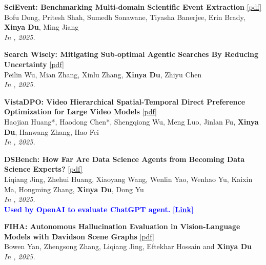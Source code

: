 \begin{enumerate}[{[}1{]},resume,leftmargin=*]
\parbox{\linewidth}{
\item
 
{\bf SciEvent: Benchmarking Multi-domain Scientific Event Extraction}
\href{https://aclanthology.org/2025.emnlp-main.871.pdf}{{{[pdf]}}} \\
Bofu Dong, Pritesh Shah, Sumedh Sonawane, Tiyasha Banerjee, Erin Brady, \textbf{Xinya Du}, Ming Jiang \\
{\it In \EMNLP, 2025.} \\
}

\parbox{\linewidth}{
\item
 
{\bf Search Wisely: Mitigating Sub-optimal Agentic Searches By Reducing Uncertainty} 
\href{https://aclanthology.org/2025.emnlp-main.998.pdf}{{{[pdf]}}} \\
Peilin Wu, Mian Zhang, Xinlu Zhang, \textbf{Xinya Du}, Zhiyu Chen \\
{\it In \EMNLP, 2025.} \\

}

\parbox{\linewidth}{
\item
 
{\bf VistaDPO: Video Hierarchical Spatial-Temporal Direct Preference Optimization for Large Video Models } 
\href{https://arxiv.org/pdf/2504.13122}{{{[pdf]}}} \\
     Haojian Huang*, Haodong Chen*, Shengqiong Wu, Meng Luo, Jinlan Fu, \textbf{Xinya Du}, Hanwang Zhang, Hao Fei\\
{\it In \ICML, 2025.} \\
}

\parbox{\linewidth}{
\item\label{pub:dsbench}
 
{\bf DSBench: How Far Are Data Science Agents from Becoming Data Science Experts?} 
\href{https://arxiv.org/pdf/2409.07703}{{{[pdf]}}} \\
     Liqiang Jing, Zhehui Huang, Xiaoyang Wang, Wenlin Yao, Wenhao Yu, Kaixin Ma, Hongming Zhang, \textbf{Xinya Du}, Dong Yu \\
{\it In \ICLR, 2025.} \\
{\textcolor{blue}{\textbf{Used by OpenAI to evaluate ChatGPT agent.}}} \href{https://openai.com/index/introducing-chatgpt-agent/}{\textcolor{blue}{\textbf{[Link]}}} \\
}

\parbox{\linewidth}{
\item
{\bf FIHA: Autonomous Hallucination Evaluation in Vision-Language Models with Davidson Scene Graphs}
\href{https://arxiv.org/pdf/2409.13612}{{{[pdf]}}} \\
     Bowen Yan, Zhengsong Zhang, Liqiang Jing, Eftekhar Hossain and \textbf{Xinya Du}\\
{\it In \ACLfinding, 2025.} \\
}


\end{enumerate}
